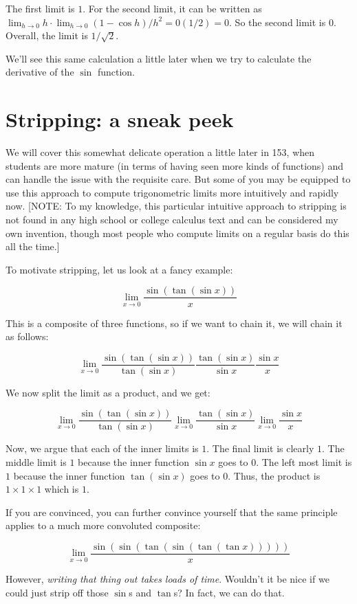 \documentclass[10pt]{amsart}
\begin{document}
The first limit is $1$. For the second limit, it can be written as
$\lim_{h \to 0} h \cdot \lim_{h \to 0} (1 - \cos h)/h^2 = 0(1/2) =
0$. So the second limit is $0$. Overall, the limit is $1/\sqrt{2}$.

We'll see this same calculation a little later when we try to
calculate the derivative of the $\sin$ function.

\section{Stripping: a sneak peek}

We will cover this somewhat delicate operation a little later in 153,
when students are more mature (in terms of having seen more kinds of
functions) and can handle the issue with the requisite care. But some
of you may be equipped to use this approach to compute trigonometric
limits more intuitively and rapidly now. [NOTE: To my knowledge, this
particular intuitive approach to stripping is not found in any high
school or college calculus text and can be considered my own
invention, though most people who compute limits on a regular basis do
this all the time.]

To motivate stripping, let us look at a fancy example:

$$\lim_{x \to 0} \frac{\sin(\tan(\sin x))}{x}$$

This is a composite of three functions, so if we want to chain it, we
will chain it as follows:

$$\lim_{x \to 0} \frac{\sin(\tan(\sin x))}{\tan(\sin x)}\frac{\tan(\sin x)}{\sin x}\frac{\sin x}{x}$$

We now split the limit as a product, and we get:

$$\lim_{x \to 0} \frac{\sin(\tan(\sin x))}{\tan(\sin x)}\lim_{x \to 0} \frac{\tan(\sin x)}{\sin x}\lim_{x \to 0} \frac{\sin x}{x}$$

Now, we argue that each of the inner limits is $1$. The final limit is
clearly $1$. The middle limit is $1$ because the inner function $\sin
x$ goes to $0$. The left most limit is $1$ because the inner function
$\tan(\sin x)$ goes to $0$. Thus, the product is $1 \times 1 \times 1$
which is $1$.

If you are convinced, you can further convince yourself that the same
principle applies to a much more convoluted composite:

$$\lim_{x \to 0} \frac{\sin(\sin(\tan(\sin(\tan(\tan x)))))}{x}$$

However, {\em writing that thing out takes loads of time}. Wouldn't it
be nice if we could just strip off those $\sin$s and $\tan$s? In fact,
we can do that.
\end{document}
